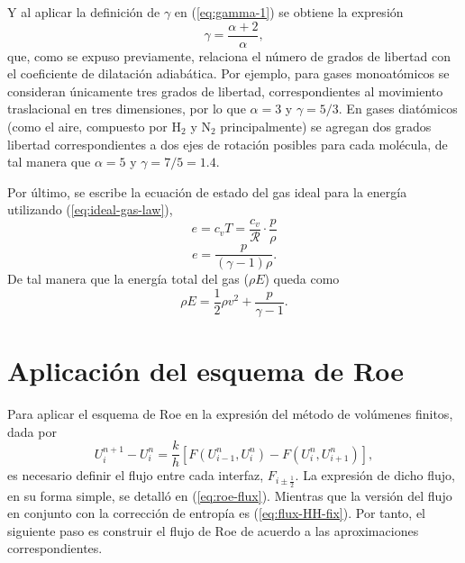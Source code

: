 Y al aplicar la definición de $\gamma$ en (\ref{eq:gamma-1}) se obtiene la expresión
\begin{equation}
	\gamma = \frac{\alpha + 2}{\alpha},
\end{equation}
que, como se expuso previamente, relaciona el número de grados de libertad con el coeficiente de dilatación adiabática. Por ejemplo, para gases monoatómicos se consideran únicamente tres grados de libertad, correspondientes al movimiento traslacional en tres dimensiones, por lo que $\alpha = 3$ y $\gamma = 5/3$. En gases diatómicos (como el aire, compuesto por $\mathrm{H}_2$ y $\mathrm{N}_2$ principalmente) se agregan dos grados libertad correspondientes a dos ejes de rotación posibles para cada molécula, de tal manera que $\alpha = 5$ y $\gamma = 7/5 = 1.4$.

Por último, se escribe la ecuación de estado del gas ideal para la energía utilizando  (\ref{eq:ideal-gas-law}),
\begin{equation}
	e = c_v T = \frac{c_v}{\mathcal{R}}\cdot\frac{p}{\rho}
\end{equation}
\begin{equation}
	e = \frac{p}{(\gamma - 1) \rho}.
\end{equation}
De tal manera que la energía total del gas ($\rho E$) queda como
\begin{equation}
	 \rho E = \frac{1}{2}\rho v^{2} + \frac{p}{\gamma - 1}.
	 \label{eq:energia-total}
\end{equation}
\section{Aplicación del esquema de Roe}
Para aplicar el esquema de Roe en la expresión del método de volúmenes finitos, dada por 
\begin{equation}
	U_{i}^{n+1}-U_{i}^{n} = 
	\frac{k}{h}\left[ F(U_{i-1}^n, U_i^n) - F(U_{i}^n, U_{i+1}^n) \right],
	\label{eq:metodo-vol-finitos-3}
\end{equation}
 es necesario definir el flujo entre cada interfaz, $F_{i\pm \frac{1}{2}}$. La expresión de dicho flujo, en su forma simple, se detalló en (\ref{eq:roe-flux}). Mientras que la versión del flujo en conjunto con la corrección de entropía es (\ref{eq:flux-HH-fix}). Por tanto, el siguiente paso es construir el flujo de Roe de acuerdo a las aproximaciones correspondientes.
